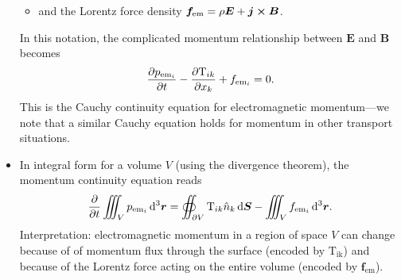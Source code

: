 \documentclass[11pt, a4paper]{article}
\newcommand{\diff}{\mathop{}\!\mathrm{d}} %
\newcommand{\dr}{\diff^{3} \r}  %
\renewcommand{\vec}[1]{\bm{#1}} %
\renewcommand{\r}{\vec{r}}
\newcommand{\E}{\vec{E}} %
\newcommand{\B}{\vec{B}} %
\newcommand{\TT}{\mathrm{T}}  %
\renewcommand{\j}{\vec{j}}  %
\begin{document}
\begin{itemize}
\begin{itemize}
        \item and the Lorentz force density $ \vec{f}_{\text{em}} = \rho \E + \j \cross \B $.
    \end{itemize}
	In this notation, the complicated momentum relationship between $ \E $ and $ \B $ becomes
	\begin{equation*}
		\pdv{p_{\text{em}_{i}}}{t} - \pdv{\TT_{ik}}{x_{k}} + f_{\text{em}_{i}} = 0.
	\end{equation*}
	This is the Cauchy continuity equation for electromagnetic momentum---we note that a similar Cauchy equation holds for momentum in other transport situations.
	
	\item In integral form for a volume $ V $ (using the divergence theorem), the momentum continuity equation reads
	\begin{equation*}
		\pdv{t}\iiint_{V}p_{\text{em}_{i}}\dr = \oiint_{\partial V}\TT_{ik}\hat{n}_{k} \diff \vec{S} - \iiint_{V} f_{\text{em}_{i}}\dr.
	\end{equation*}
	Interpretation: electromagnetic momentum in a region of space $ V $ can change because of of momentum flux through the surface (encoded by $ \TT_{\text{ik}} $) and because of the Lorentz force acting on the entire volume (encoded by $ \vec{f}_{\text{em}} $). 
	
	
\end{itemize}
\end{document}

